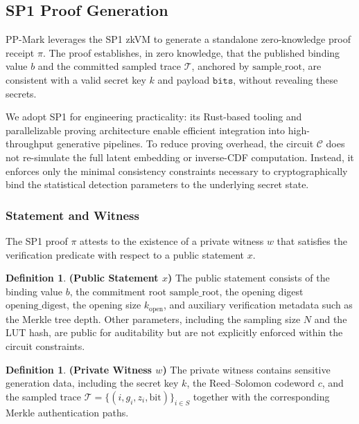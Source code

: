 \documentclass{article}
\theoremstyle{plain}
\theoremstyle{definition}
\newtheorem{definition}[theorem]{Definition}
\theoremstyle{remark}
\begin{document}
\subsection{SP1 Proof Generation}
PP-Mark leverages the SP1 zkVM \cite{succinct2024sp1} to generate a standalone zero-knowledge proof receipt \(\pi\). The proof establishes, in zero knowledge, that the published binding value \(b\) and the committed sampled trace \(\mathcal{T}\), anchored by \(\mathrm{sample\_root}\), are consistent with a valid secret key \(k\) and payload \(\mathtt{bits}\), without revealing these secrets.

We adopt SP1 for engineering practicality: its Rust-based tooling and parallelizable proving architecture enable efficient integration into high-throughput generative pipelines. To reduce proving overhead, the circuit \(\mathcal{C}\) does not re-simulate the full latent embedding or inverse-CDF computation. Instead, it enforces only the minimal consistency constraints necessary to cryptographically bind the statistical detection parameters to the underlying secret state.

\subsubsection{Statement and Witness}
The SP1 proof \(\pi\) attests to the existence of a private witness \(w\) that satisfies the
verification predicate with respect to a public statement \(x\).

\begin{definition}
  \textbf{(Public Statement \(x\))}
  The public statement consists of the binding value \(b\), the commitment root
  \(\mathrm{sample\_root}\), the opening digest \(\mathrm{opening\_digest}\), the opening size
  \(k_{\mathrm{open}}\), and auxiliary verification metadata such as the Merkle tree depth.
  Other parameters, including the sampling size \(N\) and the LUT hash, are public for
  auditability but are not explicitly enforced within the circuit constraints.
\end{definition}

\begin{definition}
  \textbf{(Private Witness \(w\))}
The private witness contains sensitive generation data, including the secret key \(k\),
the Reed--Solomon codeword \(c\), and the sampled trace
\(\mathcal{T} = \{(i, g_i, z_i, \mathrm{bit})\}_{i \in S}\) together with the corresponding
Merkle authentication paths.
\end{definition}
\end{document}
